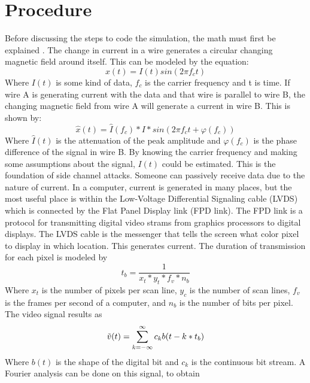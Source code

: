 \documentclass{article}
\begin{document}
\section{Procedure}
Before discussing the steps to code the simulation, the math must first be explained \cite{Marinov2014RemoteVE}. The change in current in a wire generates a circular changing magnetic field around itself. This can be modeled by the equation:
\begin{equation}
    x(t) = I(t)sin(2\pi f_ct)
\end{equation}
Where $I(t)$ is some kind of data, $f_c$ is the carrier frequency and t is time. If wire A is generating current with the data and that wire is parallel to wire B, the changing magnetic field from wire A will generate a current in wire B. This is shown by:
\begin{equation}
    \hat{x}(t) = \hat{I}(f_c)*I*sin(2\pi f_c t + \varphi(f_c))
\end{equation}
Where $\hat{I}(t)$ is the attenuation of the peak amplitude and $\varphi(f_c)$ is the phase difference of the signal in wire B. By knowing the carrier frequency and making some assumptions about the signal, $I(t)$ could be estimated. This is the foundation of side channel attacks. Someone can passively receive data due to the nature of current. 
\newline
\indent In a computer, current is generated in many places, but the most useful place is within the Low-Voltage Differential Signaling cable (LVDS) which is connected by the Flat Panel Display link (FPD link). The FPD link is a protocol for transmitting digital video strams from graphics processors to digital displays. The LVDS cable is the messenger that tells the screen what color pixel to display in which location. This generates current. The duration of transmission for each pixel is modeled by 
\begin{equation}
    t_b = \frac{1}{x_t*y_t*f_v*n_b}
\end{equation}
Where $x_t$ is the number of pixels per scan line, $y_c$ is the number of scan lines, $f_v$ is the frames per second of a computer, and $n_b$ is the number of bits per pixel. 
\newline 
\indent The video signal results as 
\begin{equation}
    \Tilde{v}(t) = \sum_{k = -\infty}^{\infty} c_kb(t - k * t_b)
\end{equation}
Where $b(t)$ is the shape of the digital bit and $c_k$ is the continuous bit stream. A Fourier analysis can be done on this signal, to obtain
\end{document}
